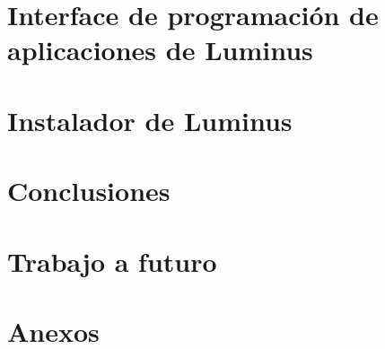 \documentclass[10pt]{book}
\begin{document}
	\chapter{Interface de programación de aplicaciones de Luminus}\label{cap:Cap4.2}

	\chapter{Instalador de Luminus}\label{cap:Cap5}
	
	
	\chapter{Conclusiones}
	\chapter{Trabajo a futuro} \label{futurolol}
	\label{referencias}
	\chapter{Anexos} 
	\label{anexoa}
	\label{anexob}
	\label{anexoc}
\end{document}
